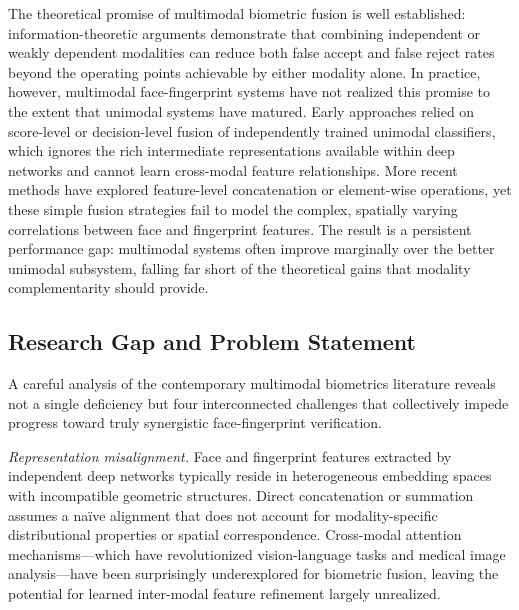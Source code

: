 \documentclass[10pt,journal,compsoc]{IEEEtran}
\begin{document}
The theoretical promise of multimodal biometric fusion is well established: information-theoretic arguments demonstrate that combining independent or weakly dependent modalities can reduce both false accept and false reject rates beyond the operating points achievable by either modality alone\cite{ross2006multimodal}. In practice, however, multimodal face-fingerprint systems have not realized this promise to the extent that unimodal systems have matured. Early approaches relied on score-level or decision-level fusion of independently trained unimodal classifiers\cite{ross2003information}, which ignores the rich intermediate representations available within deep networks and cannot learn cross-modal feature relationships. More recent methods have explored feature-level concatenation or element-wise operations\cite{mensi2022multi, singh2019multimodal}, yet these simple fusion strategies fail to model the complex, spatially varying correlations between face and fingerprint features. The result is a persistent performance gap: multimodal systems often improve marginally over the better unimodal subsystem, falling far short of the theoretical gains that modality complementarity should provide.

\subsection{Research Gap and Problem Statement}

A careful analysis of the contemporary multimodal biometrics literature reveals not a single deficiency but four interconnected challenges that collectively impede progress toward truly synergistic face-fingerprint verification.

\textit{Representation misalignment.} Face and fingerprint features extracted by independent deep networks typically reside in heterogeneous embedding spaces with incompatible geometric structures. Direct concatenation or summation assumes a na\"ive alignment that does not account for modality-specific distributional properties or spatial correspondence. Cross-modal attention mechanisms---which have revolutionized vision-language tasks\cite{lu2019vilbert} and medical image analysis\cite{chen2021transunet}---have been surprisingly underexplored for biometric fusion, leaving the potential for learned inter-modal feature refinement largely unrealized.
\end{document}

